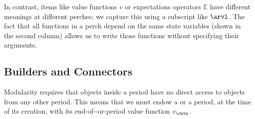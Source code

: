 \documentclass[titlepage, headings=optiontotocandhead]{econark}
\newcommand{\ifpseudo}{\ifthenelse{\boolean{pseudocode}}}
\begin{document}
  In contrast, items like value functions $v$ or expectations operators ${\mathbb{E}}$ have different meanings at different perches; we capture this using a subscript like $\arvl$.  The fact that all functions in a perch depend on the same state variables (shown in the second column) allows us to write those functions without specifying their arguments.


\ifpseudo{
\nopagebreak
}{}

\hypertarget{transitions}{}
\subsection{Builders and Connectors}\label{subsec:transitions}\label{subsubsec:builders}

Modularity requires that objects inside a period have no direct access to objects from any other period.  This means that we must endow a {\stg} or a period, at the time of its creation, with its end-of-{\stg}-or-period value function $v_{\cntn}$.
\end{document}
